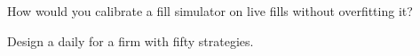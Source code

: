 \begin{interviewq}\label{iq:rs:simulation-versus-live:5}
How would you calibrate a fill simulator on live fills without overfitting it?
\end{interviewq}

\begin{interviewq}\label{iq:rs:simulation-versus-live:6}
Design a daily  for a firm with fifty strategies.
\end{interviewq}
